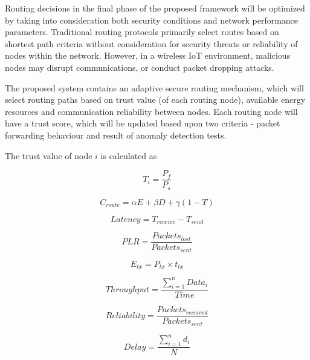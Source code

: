 \documentclass[a4paper,fleqn]{cas-dc}
\numberwithin{equation}{section}
\begin{document}
Routing decisions in the final phase of the proposed framework will be optimized by taking into consideration both security conditions and network performance parameters. Traditional routing protocols primarily select routes based on shortest path criteria without consideration for security threats or reliability of nodes within the network. However, in a wireless IoT environment, malicious nodes may disrupt communications, or conduct packet dropping attacks.

The proposed system contains an adaptive secure routing mechanism, which will select routing paths based on trust value (of each routing node), available energy resources and communication reliability between nodes. Each routing node will have a trust score, which will be updated based upon two criteria - packet forwarding behaviour and result of anomaly detection tests.

The trust value of node \(i\) is calculated as

\begin{equation}
T_i = \frac{P_f}{P_s}
\label{eq:trust}
\end{equation}

\begin{equation}
C_{route} = \alpha E + \beta D + \gamma (1-T)
\label{eq:cost}
\end{equation}

\begin{equation}
Latency = T_{receive} - T_{send}
\label{eq:latency}
\end{equation}

\begin{equation}
PLR = \frac{Packets_{lost}}{Packets_{sent}}
\label{eq:plr}
\end{equation}

\begin{equation}
E_{tx} = P_{tx} \times t_{tx}
\label{eq:etx}
\end{equation}

\begin{equation}
Throughput = \frac{\sum_{i=1}^{n} Data_i}{Time}
\label{eq:throughput_phase3}
\end{equation}

\begin{equation}
Reliability = \frac{Packets_{received}}{Packets_{sent}}
\label{eq:reliability}
\end{equation}

\begin{equation}
Delay = \frac{\sum_{i=1}^{n} d_i}{N}
\label{eq:avg_delay}
\end{equation}
\end{document}
